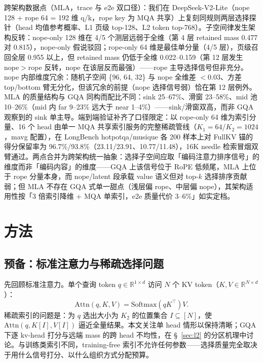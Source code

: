 \documentclass[11pt]{article}
\begin{document}
跨架构数据点（MLA，trace 与 e2e 双口径）：我们在 DeepSeek-V2-Lite（nope 128 + rope 64 = 192 维 q/k，rope key 为 MQA 共享）上复刻同规则两层选择探针（head 均值参考概率、L1 页级 top-128、L2 token top-768）。子空间律发生架构反转：nope-only 128 维在 4/5 个测层远弱于全维（第 4 层 retained mass 0.477 对 0.815），nope-only 假说驳回；rope-only 64 维是最佳单分量（4/5 层），页级召回全层 0.955 以上，但 retained mass 仍低于全维 0.022--0.159（第 12 层发生 nope$>$rope 反转，nope 在该层反而最强）——rope 主导选择信号但非充分。nope 内部维度冗余：随机子空间 \{96, 64, 32\} 与 nope 全维差 $<$0.03、方差 top/bottom 臂无分化，但该冗余的前提（nope 选择信号弱）恰在第 12 层例外。MLA 的质量结构与 GQA 同构而配比不同：sink 25--67\%、滑窗 23--58\%、mid 池 10--26\%（mid 内 far 9--23\% 远大于 near 1--4\%）——sink/滑窗双高，而非 GQA 观察到的 sink 单主导。端到端验证补齐了口径限定：以 rope-only 64 维为索引分量、16 个 head 由单一 MQA 共享索引服务的完整稀疏管线（$K_1{=}64$/$K_2{=}1024$，mavg 配置），在 LongBench hotpotqa/musique 各 200 样本上对 FullKV 锚的得分保留率为 96.7\%/93.8\%（23.11/23.91、10.77/11.48），16K needle 检索冒烟双臂通过。两点合并为跨架构统一抽象：选择子空间应取「编码注意力排序信号」的维度而非「编码内容」的维度——GQA 上该信号位于 RoPE 低频尾，MLA 上位于 rope 分量本身，而 nope/latent 段承载 value 语义但对 top-$k$ 选择排序贡献弱；但 MLA 不存在 GQA 式单一甜点（浅层偏 rope、中层偏 nope），其架构适用性按「3 倍索引降维 + MQA 单索引，e2e 质量代价 3--6\%」如实定档。

\section{方法}

\subsection{预备：标准注意力与稀疏选择问题}

先回顾标准注意力。单个查询 token $q\in\mathbb{R}^{1\times d}$ 访问 $N$ 个 KV token（$K,V\in\mathbb{R}^{N\times d}$）：
\begin{equation}
\mathrm{Attn}(q, K, V) = \mathrm{Softmax}\!\left(qK^\top\right)V.
\end{equation}
稀疏索引的问题是：为 $q$ 选出大小为 $K_2$ 的位置集合 $I\subseteq[N]$，使 $\mathrm{Attn}(q, K[I], V[I])$ 逼近全量结果。本文关注单 head 情形以保持清晰；GQA 下逐 kv-head 打分与远端 mass 的跨 head 不均性，在 §~\ref{sec:l2} 的分区机理中讨论。与训练类索引不同，training-free 索引不允许任何参数——选择质量完全取决于用什么信号打分、以什么组织方式分配预算。
\end{document}
